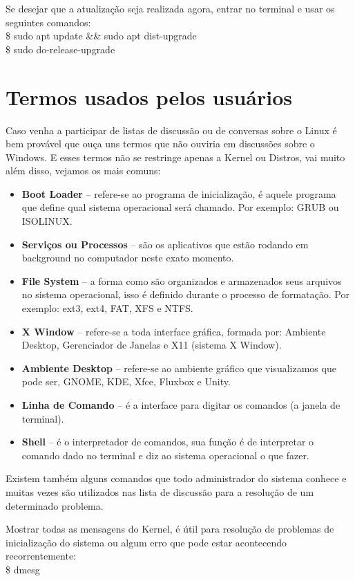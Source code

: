 Se desejar que a atualização seja realizada agora, entrar no terminal e usar os seguintes comandos: \\
{\ttfamily\$ sudo apt update \&\& sudo apt dist-upgrade \\
\$ sudo do-release-upgrade}

\section{Termos usados pelos usuários}
Caso venha a participar de listas de discussão ou de conversas sobre o Linux é bem provável que ouça uns termos que não ouviria em discussões sobre o Windows. E esses termos não se restringe apenas a Kernel ou Distros, vai muito além disso, vejamos os mais comuns:
\begin{itemize} \vspace{-1em}
   \item \textbf{Boot Loader} – refere-se ao programa de inicialização, é aquele programa que define qual sistema operacional será chamado. Por exemplo: GRUB ou ISOLINUX.
   \item \textbf{Serviços ou Processos} – são os aplicativos que estão rodando em background no computador neste exato momento.
   \item \textbf{File System} – a forma como são organizados e armazenados seus arquivos no sistema operacional, isso é definido durante o processo de formatação. Por exemplo: ext3, ext4, FAT, XFS e NTFS.
   \item \textbf{X Window} – refere-se a toda interface gráfica, formada por: Ambiente Desktop, Gerenciador de Janelas e X11 (sistema X Window).
   \item \textbf{Ambiente Desktop} – refere-se ao ambiente gráfico que visualizamos que pode ser, GNOME, KDE, Xfce, Fluxbox e Unity.
   \item \textbf{Linha de Comando} – é a interface para digitar os comandos (a janela de terminal).
   \item \textbf{Shell} – é o interpretador de comandos, sua função é de interpretar o comando dado no terminal e diz ao sistema operacional o que fazer.
\end{itemize}
Existem também alguns comandos que todo administrador do sistema conhece e muitas vezes são utilizados nas lista de discussão para a resolução de um determinado problema.

Mostrar todas as mensagens do Kernel, é útil para resolução de problemas de inicialização do sistema ou algum erro que pode estar acontecendo recorrentemente: \\
{\ttfamily\$ dmesg}

